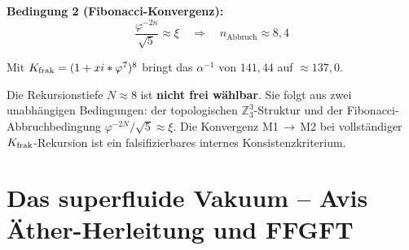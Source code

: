 \textbf{Bedingung 2 (Fibonacci-Konvergenz):}
\[
  \frac{\varphi^{-2n}}{\sqrt{5}} \approx \xi \quad \Rightarrow \quad n_{\text{Abbruch}} \approx 8{,}4
\]

Mit $K_{\text{frak}} = (1 + xi*\varphi^7)^8$ bringt das $\alpha^{-1}$ von $141{,}44$ auf $\approx 137{,}0$.

\begin{keyresult}[Konvergenzkriterium]
Die Rekursionstiefe $N \approx 8$ ist \textbf{nicht frei wählbar}. Sie folgt aus zwei unabhängigen Bedingungen: der topologischen $\mathbb{Z}_3^3$-Struktur und der Fibonacci-Abbruchbedingung $\varphi^{-2N}/\!\sqrt{5} \approx \xi$. Die Konvergenz M1\,$\to$\,M2 bei vollständiger $K_{\text{frak}}$-Rekursion ist ein falsifizierbares internes Konsistenzkriterium.
\end{keyresult}

\section{Das superfluide Vakuum -- Avis Äther-Herleitung und FFGFT}

